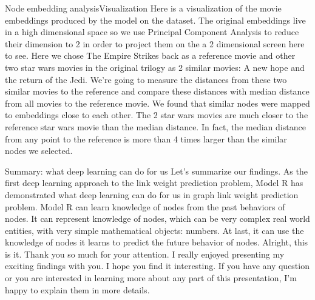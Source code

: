 \documentclass{beamer}
\begin{document}
\begin{frame}{Node embedding analysis}{Visualization}
Here is a visualization of the movie embeddings produced by the model on the dataset. The original embeddings live in a high dimensional space so we use Principal Component Analysis to reduce their dimension to 2 in order to project them on the a 2 dimensional screen here to see. Here we chose The Empire Strikes back as a reference movie and other two star wars movies in the original trilogy as 2 similar movies: A new hope and the return of the Jedi. We're going to measure the distances from these two similar movies to the reference and compare these distances with median distance from all movies to the reference movie. We found that similar nodes were mapped to embeddings close to each other. The 2 star wars movies are much closer to the reference star wars movie than the median distance. In fact, the median distance from any point to the reference is more than 4 times larger than the similar nodes we selected.
\end{frame}

\begin{frame}{Summary: what deep learning can do for us}
Let's summarize our findings. As the first deep learning approach to the link weight prediction problem, Model R has demonstrated what deep learning can do for us in graph link weight prediction problem. Model R can learn knowledge of nodes from the past behaviors of nodes. It can represent knowledge of nodes, which can be very complex real world entities, with very simple mathematical objects: numbers. At last, it can use the knowledge of nodes it learns to predict the future behavior of nodes. Alright, this is it. Thank you so much for your attention. I really enjoyed presenting my exciting findings with you. I hope you find it interesting. If you have any question or you are interested in learning more about any part of this presentation, I'm happy to explain them in more details.
\end{frame}
\end{document}
